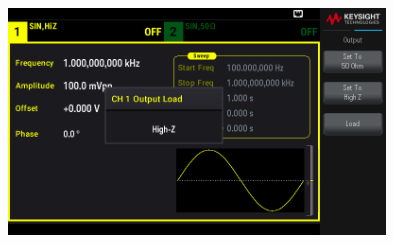 \documentclass[10pt]{PhysLab1C} %
\begin{document}
\begin{enumerate}
  \begin{figure}[H]
  \centering
  \includegraphics[width=10cm]{lab1fig/EDU33212A-term3.png}
  \caption{}
  \end{figure}
\end{enumerate}
\end{document}
